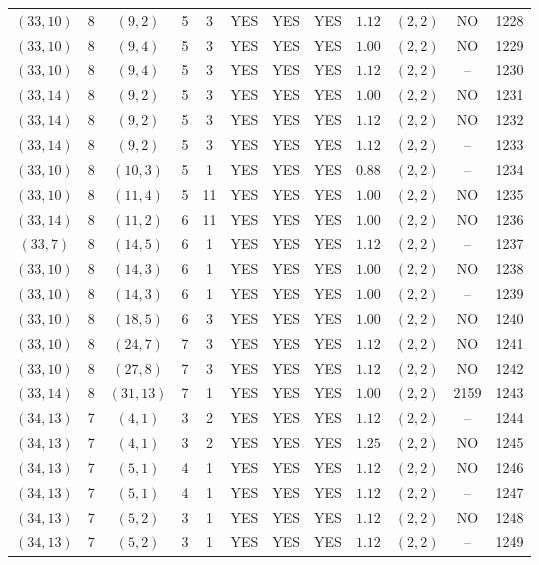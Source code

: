 \begin{longtable}{|c|c|c|c|c|c|c|c|c|c|c|c|}
$(33,10)$ & 8 & $(9,2)$ & 5 & 3 & YES & YES & YES & $1.12$ & $(2,2)$ & NO & 1228\\
$(33,10)$ & 8 & $(9,4)$ & 5 & 3 & YES & YES & YES & $1.00$ & $(2,2)$ & NO & 1229\\
$(33,10)$ & 8 & $(9,4)$ & 5 & 3 & YES & YES & YES & $1.12$ & $(2,2)$ & -- & 1230\\
$(33,14)$ & 8 & $(9,2)$ & 5 & 3 & YES & YES & YES & $1.00$ & $(2,2)$ & NO & 1231\\
$(33,14)$ & 8 & $(9,2)$ & 5 & 3 & YES & YES & YES & $1.12$ & $(2,2)$ & NO & 1232\\
$(33,14)$ & 8 & $(9,2)$ & 5 & 3 & YES & YES & YES & $1.12$ & $(2,2)$ & -- & 1233\\
$(33,10)$ & 8 & $(10,3)$ & 5 & 1 & YES & YES & YES & $0.88$ & $(2,2)$ & -- & 1234\\
$(33,10)$ & 8 & $(11,4)$ & 5 & 11 & YES & YES & YES & $1.00$ & $(2,2)$ & NO & 1235\\
$(33,14)$ & 8 & $(11,2)$ & 6 & 11 & YES & YES & YES & $1.00$ & $(2,2)$ & NO & 1236\\
$(33,7)$ & 8 & $(14,5)$ & 6 & 1 & YES & YES & YES & $1.12$ & $(2,2)$ & -- & 1237\\
$(33,10)$ & 8 & $(14,3)$ & 6 & 1 & YES & YES & YES & $1.00$ & $(2,2)$ & NO & 1238\\
$(33,10)$ & 8 & $(14,3)$ & 6 & 1 & YES & YES & YES & $1.00$ & $(2,2)$ & -- & 1239\\
$(33,10)$ & 8 & $(18,5)$ & 6 & 3 & YES & YES & YES & $1.00$ & $(2,2)$ & NO & 1240\\
$(33,10)$ & 8 & $(24,7)$ & 7 & 3 & YES & YES & YES & $1.12$ & $(2,2)$ & NO & 1241\\
$(33,10)$ & 8 & $(27,8)$ & 7 & 3 & YES & YES & YES & $1.12$ & $(2,2)$ & NO & 1242\\
$(33,14)$ & 8 & $(31,13)$ & 7 & 1 & YES & YES & YES & $1.00$ & $(2,2)$ & 2159 & 1243\\
$(34,13)$ & 7 & $(4,1)$ & 3 & 2 & YES & YES & YES & $1.12$ & $(2,2)$ & -- & 1244\\
$(34,13)$ & 7 & $(4,1)$ & 3 & 2 & YES & YES & YES & $1.25$ & $(2,2)$ & NO & 1245\\
$(34,13)$ & 7 & $(5,1)$ & 4 & 1 & YES & YES & YES & $1.12$ & $(2,2)$ & NO & 1246\\
$(34,13)$ & 7 & $(5,1)$ & 4 & 1 & YES & YES & YES & $1.12$ & $(2,2)$ & -- & 1247\\
$(34,13)$ & 7 & $(5,2)$ & 3 & 1 & YES & YES & YES & $1.12$ & $(2,2)$ & NO & 1248\\
$(34,13)$ & 7 & $(5,2)$ & 3 & 1 & YES & YES & YES & $1.12$ & $(2,2)$ & -- & 1249\\

\end{longtable}
